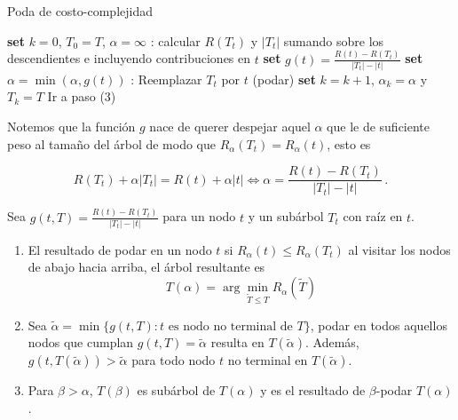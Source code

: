 \begin{algorithm}[H]
  \caption{Poda de costo-complejidad
    \label{alg:poda}}
  \begin{algorithmic}[1]
    \State\textbf{set} $k=0$, $T_0= T$, $\alpha = \infty$
    :
        \State calcular $R(T_t)$ y $|T_t|$ sumando sobre los descendientes e incluyendo contribuciones en $t$
        \State \textbf{set} $g(t) = \frac{R(t) - R(T_t)}{|T_t| - |t|}$
        \State \textbf{set} $\alpha = \min(\alpha, g(t))$
    \EndFor
    :
            \State Reemplazar $T_t$ por $t$ (podar)
                \State \textbf{set} $k = k+1$, $\alpha_k = \alpha$ y $T_k = T$
                    \State{}
                \Else
                    \State Ir a paso (3)
                \EndIf
        \EndIf
    \EndFor
    \EndFunction
  \end{algorithmic}
\end{algorithm}

Notemos que la función $g$ nace de querer despejar aquel $\alpha$ que le de suficiente peso al tamaño del árbol de modo que $R_\alpha (T_t) = R_\alpha(t)$, esto es

\begin{equation}
    R(T_t) + \alpha |T_t| = R(t) + \alpha |t| \Longleftrightarrow  \alpha = \frac{R(t) - R(T_t)}{|T_t| - |t|} \,.
\end{equation}

\begin{lemma}

    Sea $g(t,T) = \frac{R(t) - R(T_t)}{|T_t| - |t|}$ para un nodo $t$ y un subárbol $T_t$ con raíz en $t$.
    \begin{enumerate}
        \item El resultado de podar en un nodo $t$ si $R_\alpha(t) \leq R_\alpha(T_t)$ al visitar los nodos de abajo hacia arriba, el árbol resultante es
        \begin{equation}
            T(\alpha) = \arg\min_{\tilde T \leq T} R_\alpha(\tilde T)
        \end{equation}

        \item Sea $\tilde \alpha = \min \{ g(t,T) :t \text{ es nodo no terminal de } T \} $, podar en todos aquellos nodos que cumplan $g(t,T) = \tilde \alpha$ resulta en $T(\tilde \alpha)$. Además, $g(t, T(\tilde \alpha)) > \tilde \alpha$ para todo nodo $t$ no terminal en $T(\tilde \alpha)$.

        \item Para $\beta > \alpha$, $T(\beta)$ es subárbol de $T(\alpha)$ y es el resultado de $\beta$-podar $T(\alpha)$.
    \end{enumerate}
\end{lemma}

